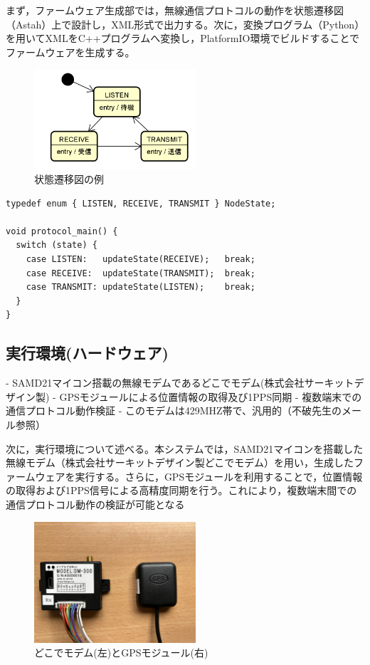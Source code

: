 \documentclass[paper]{ieicej}
\begin{document}
まず，ファームウェア生成部では，無線通信プロトコルの動作を状態遷移図（Astah）上で設計し，XML形式で出力する。次に，変換プログラム（Python）を用いてXMLをC++プログラムへ変換し，PlatformIO環境でビルドすることでファームウェアを生成する。
\begin{figure}[tb]
  \centering
  \includegraphics[width=60mm]{./images/state-machine-image.png}
  \caption{状態遷移図の例}
  \label{fig:state-machine}
\end{figure}


\begin{verbatim}
typedef enum { LISTEN, RECEIVE, TRANSMIT } NodeState;

void protocol_main() {
  switch (state) {
    case LISTEN:   updateState(RECEIVE);   break;
    case RECEIVE:  updateState(TRANSMIT);  break;
    case TRANSMIT: updateState(LISTEN);    break;
  }
}
\end{verbatim}


\subsection{実行環境(ハードウェア)}
- SAMD21マイコン搭載の無線モデムであるどこでモデム(株式会社サーキットデザイン製)
- GPSモジュールによる位置情報の取得及び1PPS同期
- 複数端末での通信プロトコル動作検証
- このモデムは429MHZ帯で、汎用的（不破先生のメール参照）

次に，実行環境について述べる。本システムでは，SAMD21マイコンを搭載した無線モデム（株式会社サーキットデザイン製どこでモデム）を用い，生成したファームウェアを実行する。さらに，GPSモジュールを利用することで，位置情報の取得および1PPS信号による高精度同期を行う。これにより，複数端末間での通信プロトコル動作の検証が可能となる
\begin{figure}[tb]
  \centering
  \includegraphics[width=60mm]{./images/devices.jpg}
  \caption{どこでモデム(左)とGPSモジュール(右)}
  \label{fig:system}
\end{figure}
\end{document}

